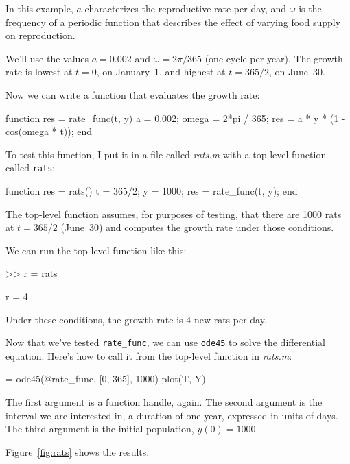
In this example, $a$ characterizes the reproductive rate per day, and
$\omega$ is the frequency of a periodic function that describes
the effect of varying food supply on reproduction.

We'll use the values $a = 0.002$
and $\omega = 2 \pi/365$ (one cycle per year).
The growth rate is lowest at $t=0$, on January~1, and highest at $t=365/2$, on June~30.

Now we can write a function that evaluates the growth rate:

\begin{code}
function res = rate_func(t, y)
    a = 0.002;
    omega = 2*pi / 365;
    res = a * y * (1 - cos(omega * t));
end
\end{code}

To test this function, I put it in a file called \emph{rats.m} with a top-level function called
\lstinline{rats}:

\begin{code}
function res = rats()
    t = 365/2;
    y = 1000;
    res = rate_func(t, y);
end
\end{code}

The top-level function assumes, for purposes of testing, that
there are 1000 rats at $t=365/2$ (June~30) and computes the growth rate under those conditions.

We can run the top-level function like this:

\begin{code}
>> r = rats

r = 4
\end{code}

Under these conditions, the growth rate is 4 new rats per day.

Now that we've tested \lstinline{rate_func}, we can use \lstinline{ode45} to solve the differential equation.
Here's how to call it from the top-level function in \emph{rats.m}:

\begin{code}
[T, Y] = ode45(@rate_func, [0, 365], 1000)
plot(T, Y)
\end{code}

The first argument is a function handle, again.  The second argument is the interval we are interested in, a duration of one year, expressed in units of days.
The third argument is the initial population, $y(0) = 1000$.


Figure~\ref{fig:rats} shows the results.

